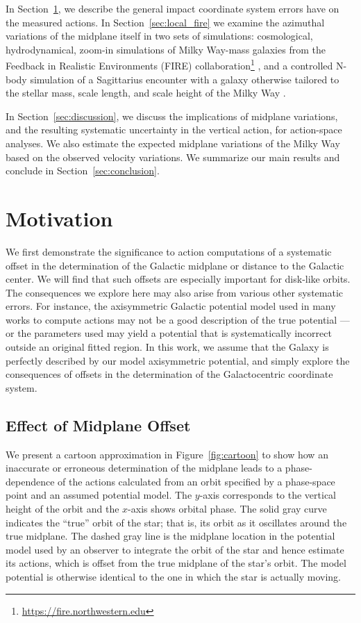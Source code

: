 \documentclass[twocolumn]{aastex62}
\begin{document}
In Section~\ref{sec:ref_frame}, we describe the general impact coordinate
system errors have on the measured actions. In
Section~\ref{sec:local_fire} we examine the azimuthal variations of the
midplane itself in two sets of simulations: cosmological, hydrodynamical,
zoom-in simulations of Milky Way-mass galaxies from the Feedback in Realistic
Environments (FIRE)
collaboration\footnote{\url{https://fire.northwestern.edu}}
\citep{2014MNRAS.445..581H, 2016ApJ...827L..23W, 2018MNRAS.480..800H}, and a
controlled N-body simulation of a Sagittarius encounter with a galaxy
otherwise tailored to the stellar mass, scale length, and scale height of the
Milky Way \citep{2018MNRAS.481..286L}.

In Section~\ref{sec:discussion}, we discuss the implications of midplane
variations, and the resulting systematic uncertainty in the vertical action,
for action-space analyses. We also estimate the expected midplane variations
of the Milky Way based on the observed velocity variations. We summarize our
main results and conclude in Section~\ref{sec:conclusion}.

\section{Motivation} \label{sec:ref_frame}
We first demonstrate the significance  to action computations of a systematic
offset in the determination of the Galactic midplane or distance to the
Galactic center. We will find that such offsets are especially important for
disk-like orbits. The consequences we explore here may also arise from various
other systematic errors. For instance, the axisymmetric Galactic potential
model used in many works to compute actions may not be a good description of
the true potential --- or the parameters used may yield a potential that is
systematically incorrect outside an original fitted region. In this work, we
assume that the Galaxy is perfectly described by our model axisymmetric
potential, and simply explore the consequences of offsets in the determination
of the Galactocentric coordinate system.

\subsection{Effect of Midplane Offset} \label{ssec:cartoon}
We present a cartoon approximation in Figure~\ref{fig:cartoon} to show how an
inaccurate or erroneous determination of the midplane leads to a phase-dependence of the actions
calculated from an orbit specified by a phase-space point and an assumed
potential model. The $y$-axis corresponds to the vertical height of the orbit
and the $x$-axis shows orbital phase. The solid gray curve indicates the
``true'' orbit of the star; that is, its orbit as it oscillates around the
true midplane. The dashed gray line is the midplane location in the potential
model used by an observer to integrate the orbit of the star and hence
estimate its actions, which is offset from the true midplane of the star's
orbit. The model potential is otherwise identical to the one in which the star
is actually moving.
\end{document}
